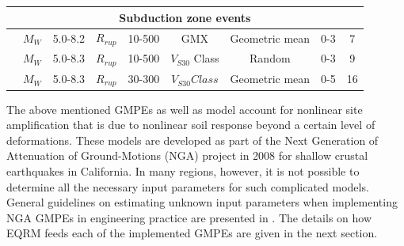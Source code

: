 \begin{landscape}
\begin{table}
{\begin{tabular}{|c|c|c|c|c|c|c|c|c|}
\hline \multicolumn{9}{|c|}{Subduction zone events}\\
\hline \citet{eqrm_Youngs97} & $M_W$ & 5.0-8.2 &
$R_{rup}$& 10-500& GMX & Geometric mean & 0-3 & 7\\
\hline \citet{eqrm_Atkinson03}& $M_W$ & 5.0-8.3 &
$R_{rup}$& 10-500& $V_{S30}$ Class & Random & 0-3 & 9\\
\hline \citet{eqrm_Zhao06} & $M_W$ & 5.0-8.3 & $R_{rup}$ &
30-300& $V_{S30} Class$ & Geometric mean & 0-5 & 16\\
\hline

\end{tabular}}
\end{table}
\end{landscape}




The above mentioned GMPEs as well as \citep{eqrm_Boore08} model
account for nonlinear site amplification that is due to nonlinear
soil response beyond a certain level of deformations. These models
are developed as part of the Next Generation of Attenuation of
Ground-Motions (NGA) project in 2008 for shallow crustal earthquakes
in California. In many regions, however, it is not possible to
determine all the necessary input parameters for such complicated
models. General guidelines on estimating unknown input parameters
when implementing NGA GMPEs in engineering practice are presented in
\citet{eqrm_Kak11}. The details on how EQRM feeds each of the
implemented GMPEs are given in the next section.
